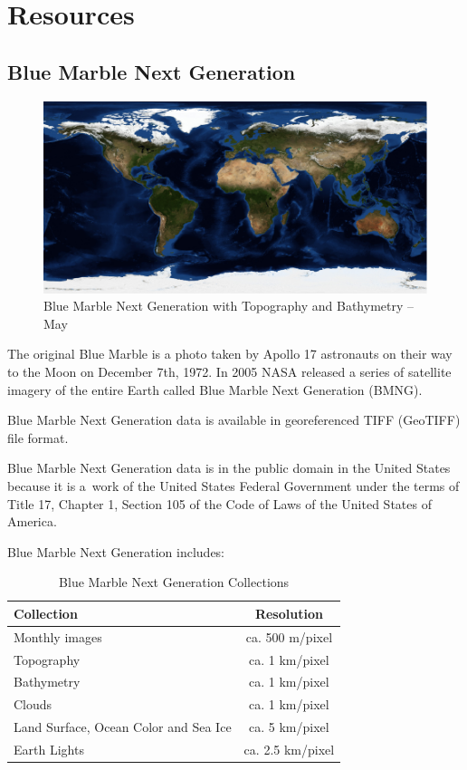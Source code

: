 \chapter{Resources}

\section{Blue Marble Next Generation}

\begin{figure}[h!]
  \centering
  \includegraphics[width=120mm]{images/bmng_topo_bathy_2004_05.eps}
  \caption{Blue Marble Next Generation with Topography and Bathymetry -- May}
\end{figure}

The original Blue Marble is a photo taken by Apollo 17 astronauts on their way to the Moon on December 7th, 1972. In 2005 NASA released a series of satellite imagery of the entire Earth called Blue Marble Next Generation (BMNG). \cite{Terrain-Stockli2005}

Blue Marble Next Generation data is available in georeferenced TIFF (GeoTIFF) file format.

Blue Marble Next Generation data is in the public domain in the United States because it is a work of the United States Federal Government under the terms of Title 17, Chapter 1, Section 105 of the Code of Laws of the United States of America.

Blue Marble Next Generation includes:
\begin{table}[h!]
  \begin{center}
    \begin{tabular}{ l | c }
      \toprule
      \textbf{Collection} & \textbf{Resolution} \\ \midrule
      Monthly images                        & ca. 500 m/pixel  \\
      Topography                            & ca. 1 km/pixel   \\
      Bathymetry                            & ca. 1 km/pixel   \\
      Clouds                                & ca. 1 km/pixel   \\
      Land Surface, Ocean Color and Sea Ice & ca. 5 km/pixel   \\
      Earth Lights                          & ca. 2.5 km/pixel \\
      \bottomrule
    \end{tabular}
    \caption{Blue Marble Next Generation Collections}
  \end{center}
\end{table}


